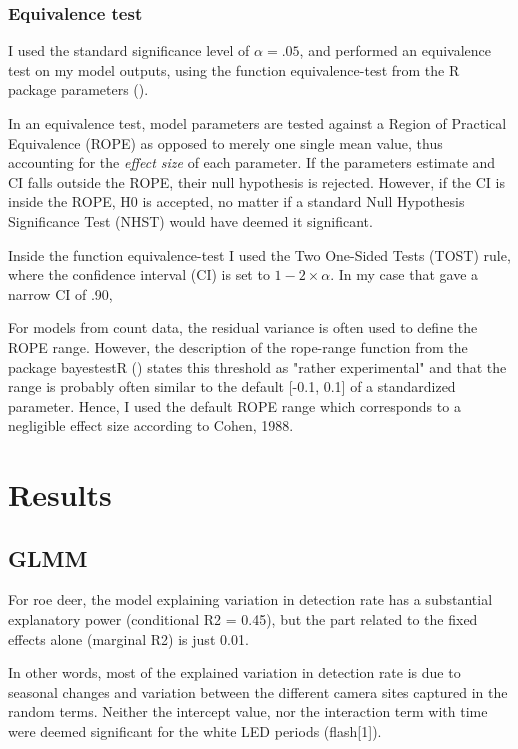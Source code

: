 



\subsection{Equivalence test}
I used the standard significance level of $\alpha = .05$, and performed an equivalence test on my model outputs, using the function equivalence-test from the R package parameters ().%

In an equivalence test, model parameters are tested against a Region of Practical Equivalence (ROPE) as opposed to merely one single mean value, thus accounting for the \emph{effect size} of each parameter.
If the parameters estimate and CI falls outside the ROPE, their null hypothesis is rejected. However, if the CI is inside the ROPE, H0 is accepted, no matter if a standard Null Hypothesis Significance Test (NHST) would have deemed it significant.

Inside the function equivalence-test I used the Two One-Sided Tests (TOST) rule, where the confidence interval (CI) is set to $1 - 2\times \alpha$. In my case that gave a narrow CI of .90,

For models from count data, the residual variance is often used to define the ROPE range. However, the description of the rope-range function from the package bayestestR () states this threshold as "rather experimental" and that the range is probably often similar to the default [-0.1, 0.1] of a standardized parameter.
Hence, I used the default ROPE range which corresponds to a negligible effect size according to Cohen, 1988.


\chapter{Results}

\section{GLMM}

For roe deer, the model explaining variation in detection rate has a substantial explanatory power (conditional R2 = 0.45), but the part related to the fixed effects alone (marginal R2) is just 0.01.

In other words, most of the explained variation in detection rate is due to seasonal changes and variation between the different camera sites captured in the random terms.
Neither the intercept value, nor the interaction term with time were deemed significant for the white LED periods (flash[1]).

